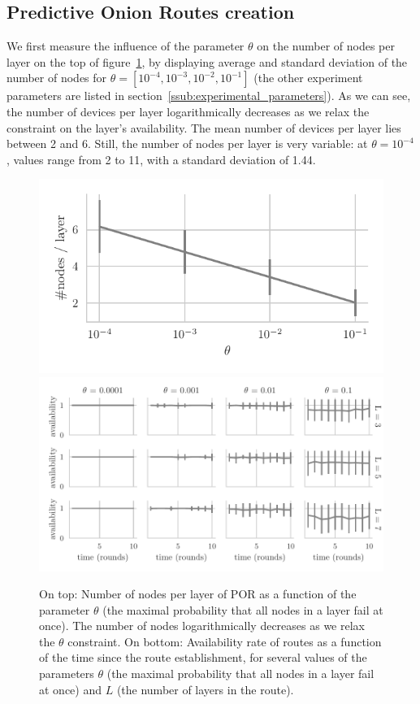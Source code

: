 \subsection{Predictive Onion Routes creation} %
\label{sub:predictive_onion_routes_creation}

We first measure the influence of the parameter $\theta$ on the number of nodes per layer on the top of figure~\ref{fig:success_rate_vs_t}, by displaying average and standard deviation of the number of nodes for $\theta=[10^{-4}, 10^{-3}, 10^{-2}, 10^{-1}]$ (the other experiment parameters are listed in section~\ref{ssub:experimental_parameters}).
As we can see, the number of devices per layer logarithmically decreases as we relax the constraint on the layer's availability.
The mean number of devices per layer lies between 2 and 6.
Still, the number of nodes per layer is very variable: at $\theta=10^{-4}$, values range from 2 to 11, with a standard deviation of 1.44. 

\begin{figure}[t]
\centering
\includegraphics[width=0.7\columnwidth]{figures/nodes_per_layer_vs_theta.pdf}
\vspace{1ex}
\includegraphics[width=0.9\columnwidth]{figures/success_rate_vs_t.pdf}
\caption{\label{fig:success_rate_vs_t}On top: Number of nodes per layer of POR as a function of the parameter $\theta$ (the maximal probability that all nodes in a layer fail at once). The number of nodes logarithmically decreases as we relax the $\theta$ constraint. On bottom: Availability rate of routes as a function of the time since the route establishment, for several values of the parameters $\theta$ (the maximal probability that all nodes in a layer fail at once) and $L$ (the number of layers in the route).}
\end{figure}

